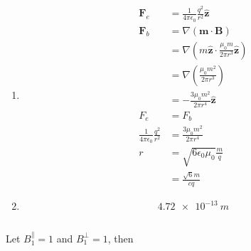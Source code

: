 \documentclass{article}
\renewcommand{\vec}[1]{\boldsymbol{\mathbf{#1}}}
\newcommand{\uvec}[1]{\hat{\vec{#1}}}
\newcommand{\ke}{\frac{1}{4 \pi \epsilon_0}}
\begin{document}
\subsection{}

\begin{enumerate}
  \item

        \begin{align*}
          \vec{F}_e           & = \ke \frac{q^2}{r^2} \uvec{z}                                              \\
          \vec{F}_b           & = \nabla (\vec{m} \cdot \vec{B})                                            \\
                              & = \nabla \left( m \uvec{z} \cdot \frac{\mu_0 m}{2 \pi r^3} \uvec{z} \right) \\
                              & = \nabla \left( \frac{\mu_0 m^2}{2 \pi r^3} \right)                         \\
                              & = -\frac{3 \mu_0 m^2}{2 \pi r^4} \uvec{z}                                   \\
          F_e                 & = F_b                                                                       \\
          \ke \frac{q^2}{r^2} & = \frac{3 \mu_0 m^2}{2 \pi r^4}                                             \\
          r                   & = \sqrt{6 \epsilon_0 \mu_0} \frac{m}{q}                                     \\
                              & = \frac{\sqrt{6} m}{c q}
        \end{align*}

  \item \[\qty{4.72e-13}{m}\]
\end{enumerate}

\setcounter{subsection}{26}
\subsection{}

Let $B_1^\parallel = 1$ and $B_1^\perp = 1$, then
\end{document}
